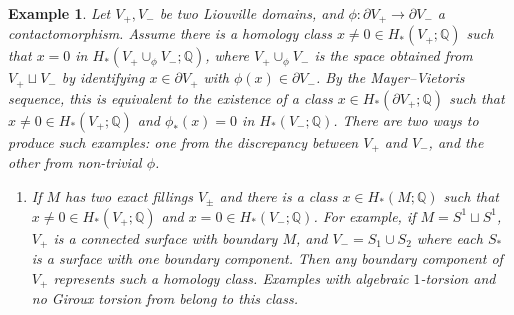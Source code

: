 \documentclass[11pt]{amsart}
\numberwithin{equation}{section}
\newtheorem{example}[theorem]{\textbf{Example}}
\def\Q{{\mathbb Q}}
\begin{document}
\begin{example}\label{ex:DG}
    Let $V_+,V_-$ be two Liouville domains, and $\phi:\partial V_+\to \partial V_-$ a contactomorphism. Assume there is a homology class $x\ne 0\in H_*(V_+;\Q)$ such that $x=0$ in $H_*(V_+\cup_{\phi}V_-;\Q)$, where $V_+\cup_{\phi}V_-$ is the space obtained from $V_+\sqcup V_-$ by identifying $x\in \partial V_+$ with $\phi(x)\in \partial V_-$. By the Mayer--Vietoris sequence, this is equivalent to the existence of a class $x\in H_*(\partial V_+;\Q)$ such that $x\ne 0\in H_*(V_+;\Q)$ and $\phi_*(x)=0$ in $H_*(V_-;\Q)$. There are two ways to produce such examples: one from the discrepancy between $V_+$ and $V_-$, and the other from non-trivial $\phi$.
    \begin{enumerate}
        \item\label{DG1} If $M$ has two exact fillings $V_{\pm}$ and there is a class $x\in H_*(M;\Q)$ such that $x\ne 0\in H_*(V_+;\Q)$ and $x=0\in H_*(V_-;\Q)$. For example, if $M=S^1\sqcup S^1$, $V_+$ is a connected surface with boundary $M$, and $V_-=S_1\cup S_2$ where each $S_*$ is a surface with one boundary component. Then any boundary component of $V_+$ represents such a homology class. Examples with algebraic $1$-torsion and no Giroux torsion from \cite[Theorem 3]{LW} belong to this class. 
        

\end{enumerate}
\end{example}
\end{document}
